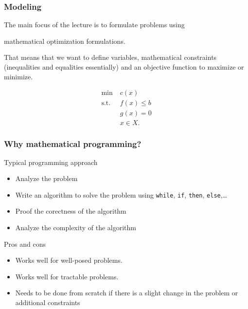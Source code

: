 \documentclass[9pt,handout]{beamer}
\begin{document}
\begin{frame}
\frametitle{Modeling}
The main focus of the lecture is to formulate problems using
\begin{center}
\alert{mathematical optimization formulations.}
\end{center}
\bigskip

That means that we want to define \alert{variables}, \alert{mathematical constraints} (inequalities and equalities
essentially) and an \alert{objective function} to maximize or minimize.\bigskip

\begin{align*}
\min \; & c(x)\\
\text{s.t. } & f(x) \leq b\\
& g(x) = 0\\
& x\in X.
\end{align*}
\end{frame}
\begin{frame}
\frametitle{Why mathematical programming?}
\begin{block}{Typical programming approach}
\begin{itemize}
\item \alert{Analyze} the problem\medskip
\item Write an algorithm to solve the problem  using \texttt{while}, \texttt{if}, \texttt{then},
\texttt{else},\ldots\medskip
\item Proof the \alert{corectness} of the algorithm\medskip
\item Analyze the \alert{complexity} of the algorithm
\end{itemize}
\end{block}
\begin{block}{Pros and cons}
\begin{itemize}
\item Works well for \alert{well-posed} problems.\medskip
\item Works well for \alert{tractable} problems.\medskip
\item Needs to be \alert{done from scratch} if there is a \alert{slight change} in the problem or additional constraints
\end{itemize}
\end{block}
\end{frame}
\end{document}
